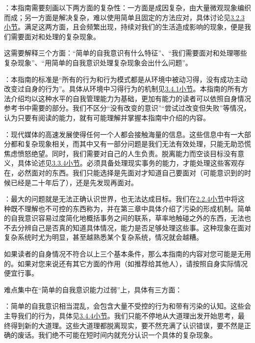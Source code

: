：本指南需要刻画以下两方面的复杂性：一方面是成因复杂，由大量微观现象编织而成；另一方面是解决复杂，难以使用简单且固定的方法应对，具体讨论见\hyperref[sec:对复杂系统的分析]{3.2.3小节}。满足这两方面，且会频繁出现，持续对我们的生活造成影响的现象，便是我们需要面对和处理的复杂现象。
\vspace{10pt}

这需要解释三个方面：“简单的自我意识有什么特征”、“我们需要面对和处理哪些复杂现象”、“用简单的自我意识处理复杂现象会出什么问题”。

：本指南的标准是“所有的行为和行为模式都是从环境中被动习得，没有成功主动改变过自身的行为”。具体从环境中习得行为的机制见\hyperref[sec:并行与竞争]{3.4.1小节}。本指南的所有方法介绍均以这种水平的自我管理能力为基础，更加有能力的读者可以依照自身情况参考书中需要的部分。我们不区分“没有改变的意识”“尝试过改变但失败”等情况，认为只要有阅读的能力，就有可能理解并掌握本指南中介绍的内容。

：现代媒体的高速发展使得任何一个人都会接触海量的信息。这些信息中有一大部分都和复杂现象相关，而其中又有一部分问题是我们无法有效处理，只能无助恐慌焦虑愤怒绝望。同时，我们需要对自己的人生负责。脱离能力而空谈目标没有意义，具体论述见\hyperref[sec:责任与要求]{3.3.4小节}。必须具备处理现实事务的能力，才能处理这些客观存在，必然面对的东西。我们只能选择是先面对才知道自己要面对（可能意识到的时候已经是二十年后了），还是先发现再面对。

：最大的问题就是无法正确认识世界，也无法达成目标。我们在\hyperref[sec:污染]{2.2.4小节}中将这种既不理解也不可控的东西称为，并在第三章中具体介绍了污染的形成机制。简单的自我意识容易过度简化地概括事务之间的联系，草率地触碰之外的东西，无法也不去分辨自己是否真的知道具体情况，能力是否足够处理这些事。这种现象在面对复杂系统时尤为明显，甚至越熟悉某个复杂系统，情况就会越糟。

如果读者的自身情况不符合以上三个基本条件，那么本指南的内容对您可能是无用的。如果对您来说还有其它方面的作用（如推荐给其他人），请按照自身实际情况便宜行事。
\vspace{10pt}

难点集中在“简单的自我意识能力过弱”上，具体有三方面：

：简单的自我意识相当混乱，会包含大量不受控的行为和带有污染的认知。这些会主导我们的行为，具体见\hyperref[sec:全局行为模式]{3.4.4小节}。我们只能不停地从大道理出发开始思考，最终得到新的大道理。这些大道理都脱离现实，要不然充满了认识错误，要不然是正确的废话。我们绝不可能在短时间内就充分认识一个具体的复杂现象。

